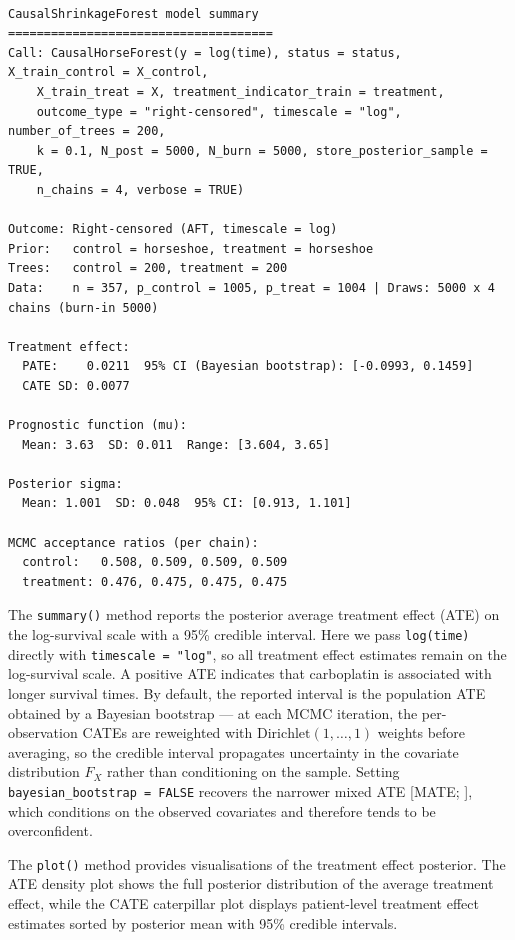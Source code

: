 \begin{verbatim}

CausalShrinkageForest model summary
=====================================
Call: CausalHorseForest(y = log(time), status = status, X_train_control = X_control, 
    X_train_treat = X, treatment_indicator_train = treatment, 
    outcome_type = "right-censored", timescale = "log", number_of_trees = 200, 
    k = 0.1, N_post = 5000, N_burn = 5000, store_posterior_sample = TRUE, 
    n_chains = 4, verbose = TRUE)

Outcome: Right-censored (AFT, timescale = log)
Prior:   control = horseshoe, treatment = horseshoe
Trees:   control = 200, treatment = 200
Data:    n = 357, p_control = 1005, p_treat = 1004 | Draws: 5000 x 4 chains (burn-in 5000)

Treatment effect:
  PATE:    0.0211  95% CI (Bayesian bootstrap): [-0.0993, 0.1459]
  CATE SD: 0.0077

Prognostic function (mu):
  Mean: 3.63  SD: 0.011  Range: [3.604, 3.65]

Posterior sigma:
  Mean: 1.001  SD: 0.048  95% CI: [0.913, 1.101]

MCMC acceptance ratios (per chain):
  control:   0.508, 0.509, 0.509, 0.509
  treatment: 0.476, 0.475, 0.475, 0.475
\end{verbatim}

The \texttt{summary()} method reports the posterior average treatment effect (ATE) on the log-survival scale with a 95\% credible interval. Here we pass \texttt{log(time)} directly with \texttt{timescale\ =\ "log"}, so all treatment effect estimates remain on the log-survival scale. A positive ATE indicates that carboplatin is associated with longer survival times. By default, the reported interval is the population ATE obtained by a Bayesian bootstrap \citep{rubin1981bayesian} --- at each MCMC iteration, the per-observation CATEs are reweighted with \(\text{Dirichlet}(1, \ldots, 1)\) weights before averaging, so the credible interval propagates uncertainty in the covariate distribution \(F_X\) rather than conditioning on the sample. Setting \texttt{bayesian\_bootstrap\ =\ FALSE} recovers the narrower mixed ATE {[}MATE; \citet{li2023bayesian}{]}, which conditions on the observed covariates and therefore tends to be overconfident.

The \texttt{plot()} method provides visualisations of the treatment effect posterior. The ATE density plot shows the full posterior distribution of the average treatment effect, while the CATE caterpillar plot displays patient-level treatment effect estimates sorted by posterior mean with 95\% credible intervals.

